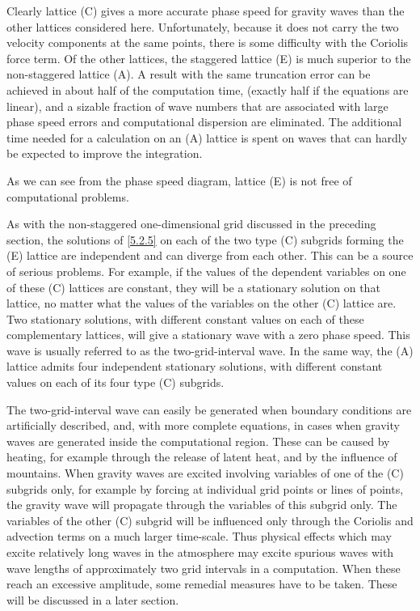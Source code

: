 Clearly lattice (C) gives a more accurate phase speed for gravity waves than the other lattices considered here. Unfortunately, because it does not carry the two velocity components at the same points, there is some difficulty with the Coriolis force term. Of the other lattices, the staggered lattice (E) is much superior to the non-staggered lattice (A). A result with the same truncation error can be achieved in about half of the computation time, (exactly half if the equations are linear), and a sizable fraction of wave numbers that are associated with large phase speed errors and computational dispersion are eliminated. The additional time needed for a calculation on an (A) lattice is spent on waves that can hardly be expected to improve the integration.

As we can see from the phase speed diagram, lattice (E) is not free of computational problems.

As with the non-staggered one-dimensional grid discussed in the preceding section, the solutions of \ref{5.2.5} on each of the two type (C) subgrids forming the (E) lattice are independent and can diverge from each other. This can be a source of serious problems. For example, if the values of the dependent variables on one of these (C) lattices are constant, they will be a stationary solution on that lattice, no matter what the values of the variables on the other (C) lattice are. Two stationary solutions, with different constant values on each of these complementary lattices, will give a stationary wave with a zero phase speed. This wave is usually referred to as the two-grid-interval wave. In the same way, the (A) lattice admits four independent stationary solutions, with different constant values on each of its four type (C) subgrids.

The two-grid-interval wave can easily be generated when boundary conditions are artificially described, and, with more complete equations, in cases when gravity waves are generated inside the computational region. These can be caused by heating, for example through the release of latent heat, and by the influence of mountains. When gravity waves are excited involving variables of one of the (C) subgrids only, for example by forcing at individual grid points or lines of points, the gravity wave will propagate through the variables of this subgrid only. The variables of the other (C) subgrid will be influenced only through the Coriolis and advection terms on a much larger time-scale. Thus physical effects which may excite relatively long waves in the atmosphere may excite spurious waves with wave lengths of approximately two grid intervals in a computation. When these reach an excessive amplitude, some remedial measures have to be taken. These will be discussed in a later section.
